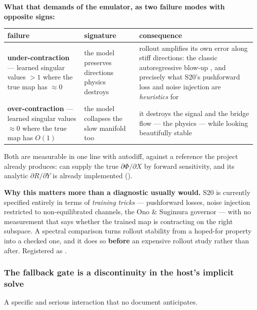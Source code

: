 \textbf{What that demands of the emulator, as two failure modes with opposite
signs:}

\begingroup
\small
\begin{tabularx}{\textwidth}{@{}L{3.6cm} L{3.6cm} Y@{}}
\toprule
\textbf{failure} & \textbf{signature} & \textbf{consequence} \\
\midrule
\textbf{under-contraction} --- learned singular values $> 1$ where the true map
  has $\approx 0$ &
  the model preserves directions physics destroys &
  rollout amplifies its own error along stiff directions: the classic
  autoregressive blow-up \citep{brandstetter2022}, and precisely what S20's
  pushforward loss \citep{brandstetter2022} and noise injection
  \citep{sanchezgonzalez2020} are \emph{heuristics} for \\
\textbf{over-contraction} --- learned singular values $\approx 0$ where the true
  map has $O(1)$ &
  the model collapses the slow manifold too &
  it destroys the \Ye{} signal and the bridge flow --- the physics --- while
  looking beautifully stable \\
\bottomrule
\end{tabularx}
\endgroup

Both are measurable in one line with autodiff, against a reference the project
already produces:  can supply the true
$\partial\Phi/\partial X$ by forward sensitivity, and its analytic
$\partial R/\partial Y$ is already implemented ().

\textbf{Why this matters more than a diagnostic usually would.} S20 is currently
specified entirely in terms of \emph{training tricks} --- pushforward losses,
noise injection restricted to non-equilibrated channels, the Ono \& Sugimura
governor --- with no measurement that says whether the trained map is
contracting on the right subspace. A spectral comparison turns rollout stability
from a hoped-for property into a checked one, and it does so \textbf{before} an
expensive rollout study rather than after. Registered as .

\subsubsection{The fallback gate is a discontinuity in the host's implicit solve}
\label{sec:dispatcher}

A specific and serious interaction that no document anticipates.


